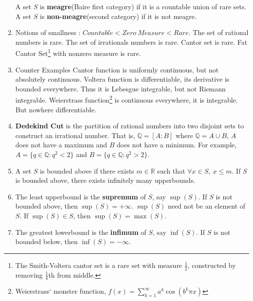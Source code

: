 \begin{enumerate}
	A set $S$ is \textbf{meagre}(Baire first category) if it is a countable union of rare sets.\\
	A set $S$ is \textbf{non-meagre}(second category) if it is not meagre.
	\item Notions of smallness : $Countable < Zero\ Measure < Rare$.
		\subitem The set of rational numbers is rare.
		\subitem The set of irrationals numbers is rare.
		\subitem Cantor set is rare. Fat Cantor Set\footnote{The Smith-Voltera cantor set is a rare set with measure $\frac{1}{2}$, constructed by removing $\frac{1}{4}$th from middle.} with nonzero measure is rare.
	\item Counter Examples
		\subitem Cantor function is uniformly continuous, but not absolutely continuous.
		\subitem Voltera function is differentiable, its derivative is bounded everywhere. Thus it is Lebesgue integrable, but not Riemann integrable. 
		\subitem Weierstrass function\footnote{Weierstrass` monster function, $f(x) = \sum_{k=1}^\infty a^k \cos (b^k\pi x)$ } is continuous everywhere, it is integrable. But nowhere differentiable.
	\item \textbf{Dedekind Cut} is the partition of rational numbers into two disjoint sets to construct an irrational number. That is, $\mathbb{Q} = [A:B]$ where $\mathbb{Q} = A \cup B$, $A$ does not have a maximum and $B$ does not have a minimum.
	For example, $A = \{ q \in \mathbb{Q} : q^2 < 2 \}$ and $B = \{ q \in \mathbb{Q} : q^2 > 2 \}$. 
	\item A set $S$ is bounded above if there exists $m \in \mathbb{R}$ such that $\forall x \in S,\ x \le m$.
		\subitem If $S$ is bounded above, there exists infinitely many upperbounds.
	\item The least upperbound is the \textbf{supremum} of $S$, say $\sup(S)$.
		\subitem If $S$ is not bounded above, then $\sup(S) = +\infty$. 
		\subitem $\sup(S)$ need not be an element of $S$. If $\sup(S) \in S$, then $\sup(S) = \max(S)$.
	\item The greatest lowerbound is the \textbf{infimum} of $S$, say $\inf(S)$.
		\subitem If $S$ is not bounded below, then $\inf(S) = -\infty$.
\end{enumerate}


